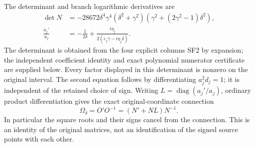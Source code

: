 \documentclass[11pt]{article}
\newcommand{\diag}{\operatorname{diag}}
\begin{document}
The determinant and branch logarithmic derivatives are
\begin{align}
 \det N&=-28672\delta^4\gamma^4(\delta^2+\gamma^2)
                         (\gamma^2+(2\gamma^2-1)\delta^2),\nonumber\\
 \frac{a_j'}{a_j}&=-\frac1{2\delta}
       +\frac{i\eta_j}{2(\varepsilon_j\gamma-i\eta_j\delta)}.
 \tag{SF3}
\end{align}
The determinant is obtained from the four explicit columns SF2
by expansion; the independent coefficient identity and exact
polynomial numerator certificate are supplied below. Every factor
displayed in this determinant is nonzero on the original interval.
The second equation follows by differentiating $a_j^2d_j=1$;
it is independent of the retained choice of sign.
Writing $L=\diag(a_j'/a_j)$, ordinary product differentiation gives
the exact original-coordinate connection
\begin{equation}
 \Omega_\delta=O'O^{-1}=(N'+NL)N^{-1}.\tag{SF4}
\end{equation}
In particular the square roots and their signs cancel from the
connection. This is an identity of the original matrices, not an
identification of the signed source points with each other.
\end{document}
